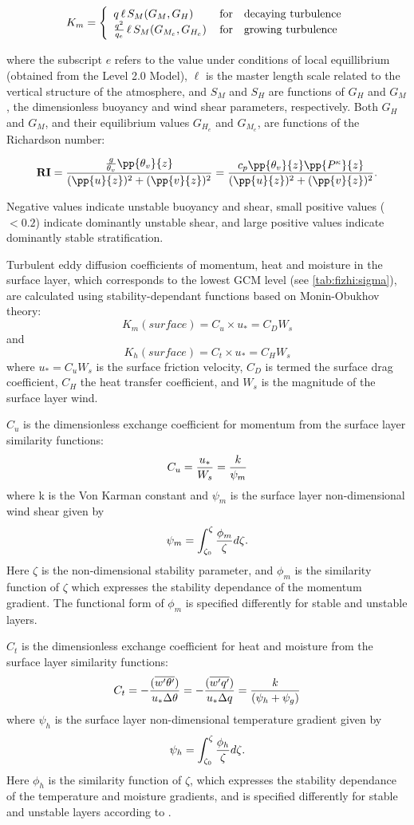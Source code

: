 \[
K_m
 = \left\{ \begin{array}{l@{\quad\mbox{for}\quad}l} q \, \ell \, S_M(G_M,G_H) \, & \mbox{decaying turbulence}                
\\ { q^2 \over {q_e} } \, \ell \, S_{M}(G_{M_e},G_{H_e}) \, & \mbox{growing turbulence} \end{array} \right.
\]

where the subscript $e$ refers to the value under conditions of local equillibrium
(obtained from the Level 2.0 Model), $\ell$ is the master length scale related to the 
vertical structure of the atmosphere,
and $S_M$ and $S_H$ are functions of $G_H$ and $G_M$, the dimensionless buoyancy and
wind shear parameters, respectively.
Both $G_H$ and $G_M$, and their equilibrium values $G_{H_e}$ and $G_{M_e}$,
are functions of the Richardson number:

\[
{\bf RI} = { { {g \over \theta_v} \pp {\theta_v}{z} } \over { (\pp{u}{z})^2 + (\pp{v}{z})^2 } }
 =  {  {c_p \pp{\theta_v}{z} \pp{P^ \kappa}{z} } \over { (\pp{u}{z})^2 + (\pp{v}{z})^2 } } .
\]

Negative values indicate unstable buoyancy and shear, small positive values ($<0.2$)
indicate dominantly unstable shear, and large positive values indicate dominantly stable
stratification.

Turbulent eddy diffusion coefficients of momentum, heat and moisture in the surface layer,
which corresponds to the lowest GCM level (see \ref{tab:fizhi:sigma}),
are calculated using stability-dependant functions based on Monin-Obukhov theory:
\[
{K_m} (surface) = C_u \times u_* = C_D W_s
\]
and
\[
{K_h} (surface) =  C_t \times u_* = C_H W_s
\]
where $u_*=C_uW_s$ is the surface friction velocity,
$C_D$ is termed the surface drag coefficient, $C_H$ the heat transfer coefficient, 
and $W_s$ is the magnitude of the surface layer wind.

$C_u$ is the dimensionless exchange coefficient for momentum from the surface layer
similarity functions: 
\[
{C_u} = {u_* \over W_s} = { k \over \psi_{m} }
\]
where k is the Von Karman constant and $\psi_m$ is the surface layer non-dimensional 
wind shear given by
\[
\psi_{m} = {\int_{\zeta_{0}}^{\zeta} {\phi_{m} \over \zeta} d \zeta} .
\]
Here $\zeta$ is the non-dimensional stability parameter, and
$\phi_m$ is the similarity function of $\zeta$ which expresses the stability dependance of
the momentum gradient.  The functional form of $\phi_m$ is specified differently for stable and unstable 
layers.

$C_t$ is the dimensionless exchange coefficient for heat and 
moisture from the surface layer similarity functions:
\[
{C_t} = -{( {\overline{w^{\prime}\theta^{\prime}}}) \over {u_* \Delta \theta }} =
-{( {\overline{w^{\prime}q^{\prime}}}) \over {u_* \Delta q }} =
{ k \over { (\psi_{h} + \psi_{g}) } }
\]
where $\psi_h$ is the surface layer non-dimensional temperature gradient given by
\[
\psi_{h} = {\int_{\zeta_{0}}^{\zeta} {\phi_{h} \over \zeta} d \zeta} .
\]
Here $\phi_h$ is the similarity function of $\zeta$, which expresses the stability dependance of
the temperature and moisture gradients, and is specified differently for stable and unstable
layers according to \cite{helfschu:95}.


